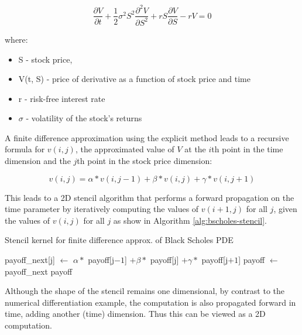 \begin{equation}
  \frac{\partial V}{\partial t} + \frac{1}{2}\sigma^2S^2\frac{\partial^2 V}{\partial S^2} + rS\frac{\partial V}{\partial S} -rV = 0
\end{equation}

where:
\begin{itemize}
\item S - stock price,
\item V(t, S) - price of derivative as a function of stock price and time
\item r - risk-free interest rate
\item $\sigma$ - volatility of the stock's returns
\end{itemize}

A finite difference approximation using the explicit method leads to a
recursive formula \cite{blackscholes} for $v(i, j)$, the approximated
value of $V$ at the $i$th point in the time dimension and the $j$th
point in the stock price dimension:

\begin{equation}
  v(i, j) =
  \alpha * v(i, j - 1) +
  \beta  * v(i, j) +
  \gamma * v(i, j + 1)
\end{equation}

This leads to a 2D stencil algorithm that performs a forward
propagation on the time parameter by iteratively computing the values
of $v(i + 1, j)$ for all $j$, given the values of $v(i, j)$ for all
$j$ as show in Algorithm \ref{alg:bscholes-stencil}.

\begin{algorithm}
  \caption{Stencil kernel for finite difference approx. of Black Scholes PDE}
  \label{alg:bscholes-stencil}
  \begin{algorithmic}
    \State payoff\_next[j] $\gets$ $\alpha *$ payoff[j$ -1$] $+ \beta *$ payoff[j] $ + \gamma * $ payoff[j$ + 1$]
    \EndFor
    \State payoff $\gets$ payoff\_next
    \EndFor
    \State \Return payoff
    \EndFunction
  \end{algorithmic}
\end{algorithm}

Although the shape of the stencil remains one dimensional, by contrast to
the numerical differentiation example, the computation is also
propagated forward in time, adding another (time) dimension. Thus this
can be viewed as a 2D computation.


